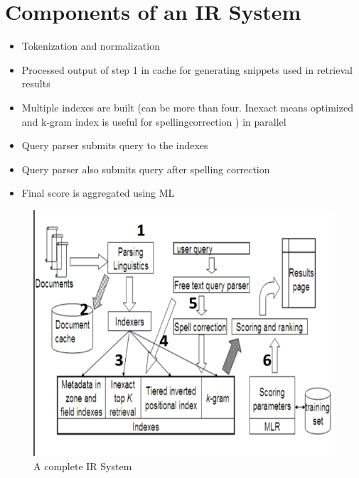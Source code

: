 \documentclass{article}
\begin{document}
\section{Components of an IR System}
\begin{itemize}
    \item Tokenization and normalization
    
    \item  Processed output of step 1 in cache for generating snippets used in retrieval results
    
    \item Multiple indexes are built (can be more than four. Inexact means optimized and k-gram index is useful for spellingcorrection ) in parallel
    
    \item Query parser submits query to the indexes

    \item Query parser also submits query after spelling correction
    
    \item Final score is aggregated using ML
\end{itemize}
\begin{figure}[!h]
    \centering
    \includegraphics[scale=0.6]{p2.png}
    \caption{A complete IR System}
    \label{fig:my_label_2}
\end{figure}
\end{document}
